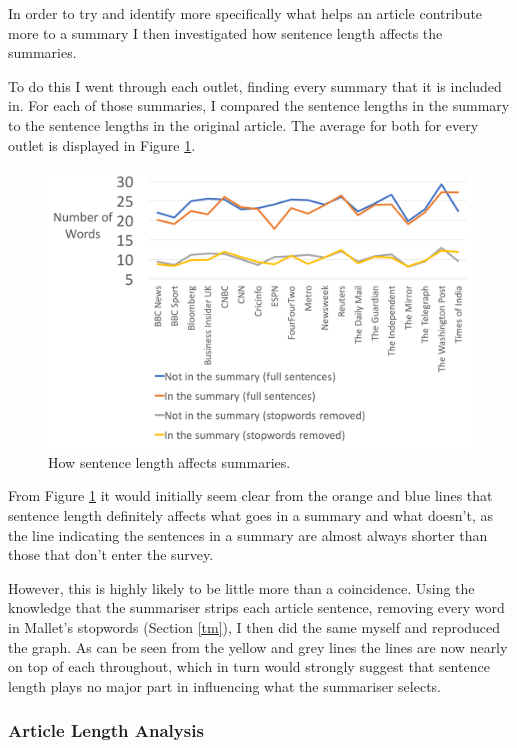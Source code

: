 \documentclass[12pt]{article}
\begin{document}
In order to try and identify more specifically what helps an article contribute more to a summary I then investigated how sentence length affects the summaries.

To do this I went through each outlet, finding every summary that it is included in. For each of those summaries, I compared the sentence lengths in the summary to the sentence lengths in the original article. The average for both for every outlet is displayed in Figure \ref{sentencestats}.

\begin{figure}[ht!]
  \centering
    \includegraphics[scale=0.4]{sentencestats.png}
   \caption[A graph depicting responses to the User Interface Survey]{How sentence length affects summaries.}
   \label{sentencestats}
\end{figure}

From Figure \ref{sentencestats} it would initially seem clear from the orange and blue lines that sentence length definitely affects what goes in a summary and what doesn't, as the line indicating the sentences in a summary are almost always shorter than those that don't enter the survey. 

However, this is highly likely to be little more than a coincidence. Using the knowledge that the summariser strips each article sentence, removing every word in Mallet's stopwords \cite{mallet} (Section \ref{tm}), I then did the same myself and reproduced the graph. As can be seen from the yellow and grey lines the lines are now nearly on top of each throughout, which in turn would strongly suggest that sentence length plays no major part in influencing what the summariser selects.

\subsubsection{Article Length Analysis}
\end{document}
